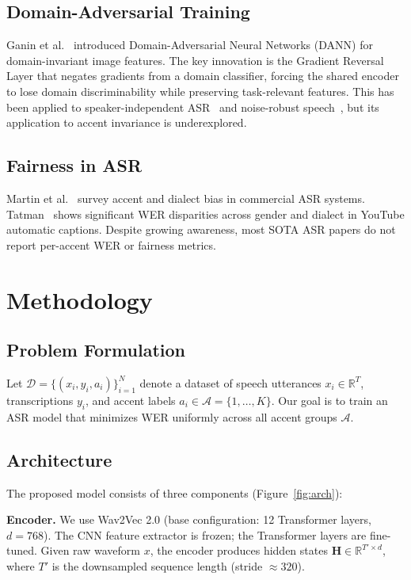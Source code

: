 \documentclass[10pt,twocolumn,letterpaper]{article}
\begin{document}
\subsection{Domain-Adversarial Training}

Ganin et al.~\cite{ganin2016domain} introduced Domain-Adversarial Neural Networks (DANN) for domain-invariant image features. The key innovation is the Gradient Reversal Layer that negates gradients from a domain classifier, forcing the shared encoder to lose domain discriminability while preserving task-relevant features. This has been applied to speaker-independent ASR~\cite{sun2018adversarial} and noise-robust speech~\cite{shinohara2016adversarial}, but its application to accent invariance is underexplored.

\subsection{Fairness in ASR}

Martin et al.~\cite{martin2021bias} survey accent and dialect bias in commercial ASR systems. Tatman~\cite{tatman2017gender} shows significant WER disparities across gender and dialect in YouTube automatic captions. Despite growing awareness, most SOTA ASR papers do not report per-accent WER or fairness metrics.

\section{Methodology}

\subsection{Problem Formulation}

Let $\mathcal{D} = \{(x_i, y_i, a_i)\}_{i=1}^N$ denote a dataset of speech utterances $x_i \in \mathbb{R}^T$, transcriptions $y_i$, and accent labels $a_i \in \mathcal{A} = \{1, \ldots, K\}$. Our goal is to train an ASR model that minimizes WER uniformly across all accent groups $\mathcal{A}$.

\subsection{Architecture}

The proposed model consists of three components (Figure~\ref{fig:arch}):

\textbf{Encoder.} We use Wav2Vec 2.0 (base configuration: 12 Transformer layers, $d=768$). The CNN feature extractor is frozen; the Transformer layers are fine-tuned. Given raw waveform $x$, the encoder produces hidden states $\mathbf{H} \in \mathbb{R}^{T' \times d}$, where $T'$ is the downsampled sequence length (stride $\approx 320$).
\end{document}
